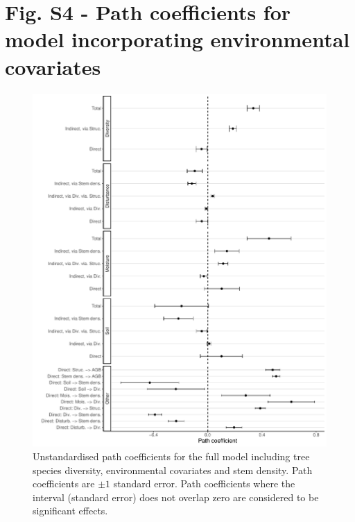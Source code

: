 \documentclass[11pt,a4paper]{article}
\begin{document}
\section*{Fig. S4 - Path coefficients for model incorporating environmental covariates} \label{appendixd}

\begin{figure}[H]
\centering
	\includegraphics[width=\textwidth]{full_model_slopes}
	\caption{Unstandardised path coefficients for the full model including tree species diversity, environmental covariates and stem density. Path coefficients are $\pm1$ standard error. Path coefficients where the interval (standard error) does not overlap zero are considered to be significant effects.}
	\label{full_model_slopes}
\end{figure}
\end{document}

